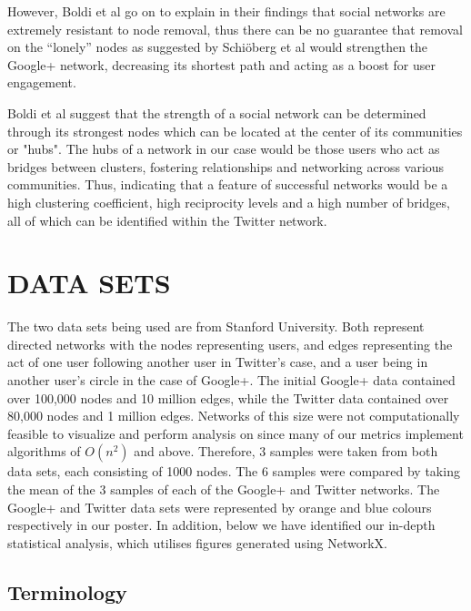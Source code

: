 \documentclass[a4paper, 10pt, conference]{ieeeconf}      %
\begin{document}
However, Boldi et al \cite{c15} go on to explain in their findings that social networks are extremely resistant to node removal, thus there can be no guarantee that removal on the “lonely” nodes as suggested by Schi\"oberg et al \cite{c13} would strengthen the Google+ network, decreasing its shortest path and acting as a boost for user engagement.

Boldi et al \cite{c15} suggest that the strength of a social network can be determined through its strongest nodes which can be located at the center of its communities or "hubs". The hubs of a network in our case would be those users who act as bridges between clusters, fostering relationships and networking across various communities. Thus, indicating that a feature of successful networks would be a high clustering coefficient, high reciprocity levels and a high number of bridges, all of which can be identified within the Twitter network.

\section{DATA SETS}

The two data sets being used are from Stanford University. Both represent directed networks with the nodes representing users, and edges representing the act of one user following another user in Twitter's case, and a user being in another user's circle in the case of Google+. The initial Google+ \cite{c11} data contained over 100,000 nodes and 10 million edges, while the Twitter \cite{c10} data contained over 80,000 nodes and 1 million edges. Networks of this size were not computationally feasible to visualize and perform analysis on since many of our metrics implement algorithms of $O(n^2)$ and above. Therefore, 3 samples were taken from both data sets, each consisting of 1000 nodes. The 6 samples were compared by taking the mean of the 3 samples of each of the Google+ and Twitter networks. The Google+ and Twitter data sets were represented by orange and blue colours respectively in our poster. In addition, below we have identified our in-depth statistical analysis, which utilises figures generated using NetworkX.

\subsection{Terminology}
\end{document}
